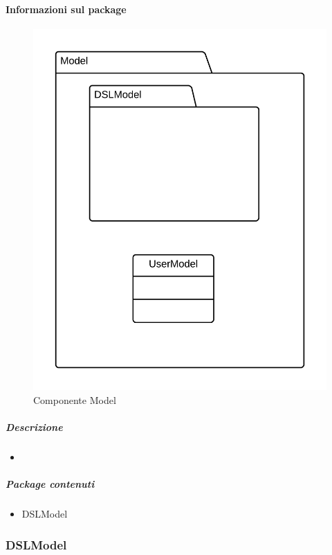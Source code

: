   \paragraph{Informazioni sul package} 
    \begin{figure}[H] 
      \begin{center} 
        \includegraphics[width=\textwidth]{packages/Back-end::Lib::Model.png}  
        \caption{Componente Model}
      \end{center}  
    \end{figure} 
  \subparagraph{Descrizione} 
    \begin{itemize}
    \item[] 
    \end{itemize} 
    \subparagraph{Package contenuti} 
    \begin{itemize}
        \item DSLModel
    \end{itemize}
  \subsubsection{DSLModel}
